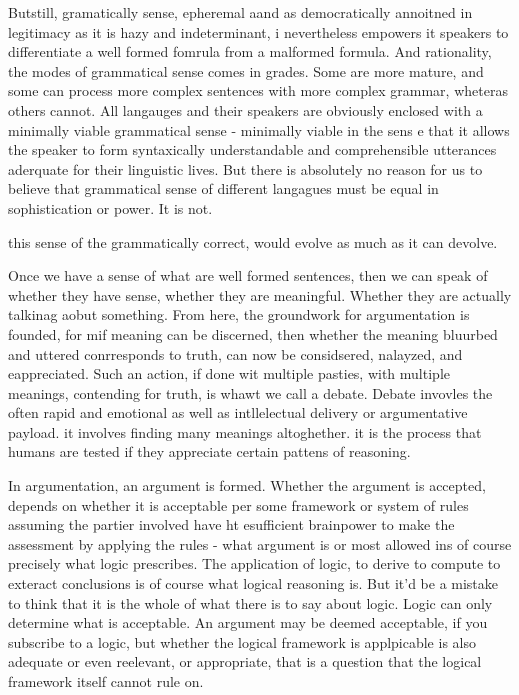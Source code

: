 Butstill, gramatically sense, epheremal aand as democratically annoitned in legitimacy as it is hazy and indeterminant, i nevertheless empowers it speakers to differentiate a well formed fomrula from a malformed formula. And rationality, the modes of grammatical sense comes in grades. Some are more mature, and some can process more complex sentences with more complex grammar, wheteras others cannot. All langauges and their speakers are obviously enclosed with a minimally viable grammatical sense - minimally viable in the sens e that it allows the speaker to form syntaxically understandable and comprehensible utterances  aderquate for their linguistic lives. But there is absolutely no reason for us to believe that grammatical sense of different langagues must be equal in sophistication or power. It is not. 

this sense of the grammatically correct, would evolve as much as it can devolve. 


Once we have a sense of what are well formed sentences, then we can speak of whether they have sense, whether they are meaningful. Whether they are actually talkinag aobut something. From here, the groundwork for argumentation is founded, for mif meaning can be discerned, then whether the meaning bluurbed and uttered conrresponds to truth, can now be considsered, nalayzed, and eappreciated. Such an action, if done wit multiple pasties, with multiple meanings, contending for truth, is whawt we call a debate. Debate invovles the often rapid and emotional as well as intllelectual delivery or argumentative payload. it involves finding many meanings altoghether. it is the process that humans are tested if they appreciate certain pattens of reasoning. 

In argumentation, an argument is formed. Whether the argument is accepted, depends on whether it is acceptable per some framework or system of rules assuming the partier involved have ht esufficient brainpower to make the assessment by applying the rules - what argument is or most allowed ins of course precisely what logic prescribes. The application of logic, to derive to compute to exteract conclusions is of course what logical reasoning is. But it'd be a mistake to think that it is the whole of what there is to say about logic. Logic can only determine what is acceptable. An argument may be deemed acceptable, if you subscribe to a logic, but whether the logical framework is applpicable is also adequate or even reelevant, or appropriate, that is a question that the logical framework itself cannot rule on. 

